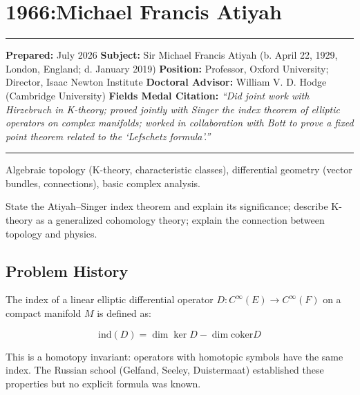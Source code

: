 \chapter{1966:Michael Francis Atiyah}\label{ch1966michael-francis-atiyah:michael-francis-atiyah-fields-medal-1966-a-comprehensive-report}

\begin{center}\rule{0.5\linewidth}{0.5pt}\end{center}

\textbf{Prepared:} July 2026
\textbf{Subject:} Sir Michael Francis Atiyah (b. April 22, 1929, London, England; d. January 2019)
\textbf{Position:} Professor, Oxford University; Director, Isaac Newton Institute
\textbf{Doctoral Advisor:} William V. D. Hodge (Cambridge University)
\textbf{Fields Medal Citation:} \emph{``Did joint work with Hirzebruch in K-theory;
proved jointly with Singer the index theorem of elliptic operators on complex
manifolds; worked in collaboration with Bott to prove a fixed point theorem
related to the `Lefschetz formula'.''}

\begin{center}\rule{0.5\linewidth}{0.5pt}\end{center}

\begin{prereqs}
Algebraic topology (K-theory, characteristic classes), differential
geometry (vector bundles, connections), basic complex analysis.
\end{prereqs}

\begin{objectives}
State the Atiyah--Singer index theorem and explain its significance;
describe K-theory as a generalized cohomology theory; explain the
connection between topology and physics.
\end{objectives}

\section{Problem History}

The index of a linear elliptic differential operator $D: C^\infty(E) \to
C^\infty(F)$ on a compact manifold $M$ is defined as:

\[\text{ind}(D) = \dim \ker D - \dim \text{coker} D\]

This is a homotopy invariant: operators with homotopic symbols have the same
index. The Russian school (Gelfand, Seeley, Duistermaat) established these
properties but no explicit formula was known.


